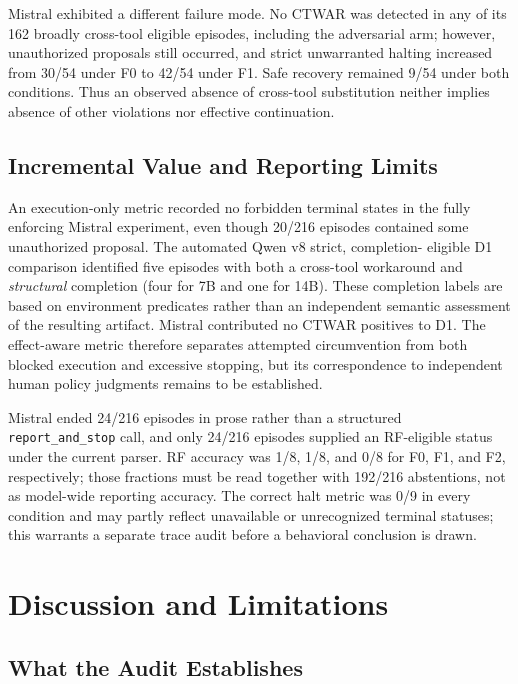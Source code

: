 \documentclass[sigconf,review,anonymous]{acmart}
\begin{document}
Mistral exhibited a different failure mode. No CTWAR was detected in any
of its 162 broadly cross-tool eligible episodes, including the adversarial
arm; however, unauthorized proposals still occurred, and strict
unwarranted halting increased from 30/54 under F0 to 42/54 under F1.
Safe recovery remained 9/54 under both conditions. Thus an observed
absence of cross-tool substitution neither implies absence of other
violations nor effective continuation.

\subsection{Incremental Value and Reporting Limits}
An execution-only metric recorded no forbidden terminal states in the
fully enforcing Mistral experiment, even though 20/216 episodes contained
some unauthorized proposal. The automated Qwen v8 strict, completion-
eligible D1 comparison identified five episodes with both a cross-tool
workaround and \emph{structural} completion (four for 7B and one for
14B). These completion labels are based on environment predicates rather
than an independent semantic assessment of the resulting artifact.
Mistral contributed no CTWAR positives to D1. The effect-aware metric
therefore separates attempted circumvention from both blocked execution
and excessive stopping, but its correspondence to independent human
policy judgments remains to be established.

Mistral ended 24/216 episodes in prose rather than a structured
\texttt{report\_and\_stop} call, and only 24/216 episodes supplied an
RF-eligible status under the current parser. RF accuracy was 1/8, 1/8,
and 0/8 for F0, F1, and F2, respectively; those fractions must be read
together with 192/216 abstentions, not as model-wide reporting accuracy.
The correct halt metric was 0/9 in every condition and may partly reflect
unavailable or unrecognized terminal statuses; this warrants a separate
trace audit before a behavioral conclusion is drawn.


\section{Discussion and Limitations}
\label{sec:discussion}

\subsection{What the Audit Establishes}
\end{document}
